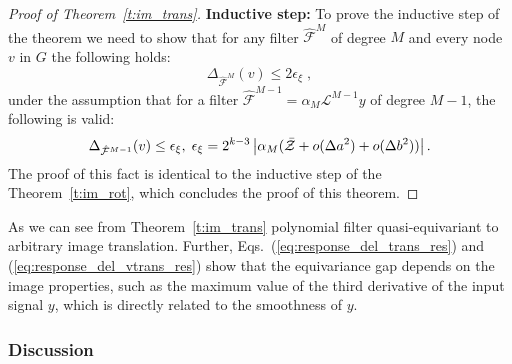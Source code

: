 \documentclass[10pt,journal,compsoc]{IEEEtran}
\newcommand{\renata}[1]{\textcolor{black}{#1}}
\newcommand{\hmF}{\hat{\mathcal{F}}}
\newcommand{\norm}[1]{\left|#1\right|}
\begin{document}
\begin{proof}[Proof of Theorem~\ref{t:im_trans}]
		\textbf{Inductive step:} %
		To prove the inductive step of the theorem we need to show that for any filter $\hmF^M$ of degree $M$ and every node $v$ in $G$ the following holds:
			\begin{equation}
			\Delta_{\hmF^M} (v) \leq 2\epsilon_\xi\;,
			\end{equation}
			\noindent
			under the assumption that for a filter $\hmF^{M-1} = \alpha_M \mathcal{L}^{M-1} y$ of degree $M-1$, the following is valid:
			\begin{equation}
			\small
			\Delta_{\hmF^{M-1}} (v) \leq \epsilon_\xi, \; \epsilon_\xi = 2^{k-3} \norm{\alpha_M (\bar{\mathcal{Z}} + o(\Delta a^2) + o(\Delta b^2))}.
			\end{equation}
			\noindent
			The proof of this fact is identical to the inductive step of the Theorem~\ref{t:im_rot}, which concludes the proof of this theorem.

	\end{proof}

	As we can see from Theorem~{\ref{t:im_trans}} polynomial filter quasi-equivariant to arbitrary image translation. Further, Eqs.~(\ref{eq:response_del_trans_res}) and (\ref{eq:response_del_vtrans_res}) show that the equivariance gap depends on the image properties, such as the maximum value of the third derivative of the input signal $y$, which is directly related to the smoothness of $y$. %

	\subsubsection{Discussion}
	\label{s:discussion}
\end{document}
